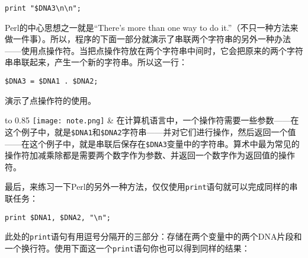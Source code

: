 \begin{lstlisting}
print "$DNA3\n\n";
\end{lstlisting}

Perl的中心思想之一就是“There's more than one way to do it.”（不只一种方法来做一件事）。所以，程序的下面一部分就演示了串联两个字符串的另外一种办法——使用点操作符。当把点操作符放在两个字符串中间时，它会把原来的两个字符串串联起来，产生一个新的字符串。所以这一行：

\begin{lstlisting}
$DNA3 = $DNA1 . $DNA2;
\end{lstlisting}
演示了点操作符的使用。


\vspace{-5pt}
\begin{table}[h]
  \begin{center}
    \begin{tabu*} to 0.85\linewidth {|X[1,r,m]X[15,l,m]|}
      \tabucline{-}
      \texttt{[image: note.png]} & 在计算机语言中，一个操作符需要一些参数——在这个例子中，就是\verb|$DNA1|和\verb|$DNA2|字符串——并对它们进行操作，然后返回一个值——在这个例子中，就是串联后保存在\verb|$DNA3|变量中的字符串。算术中最为常见的操作符加减乘除都是需要两个数字作为参数、并返回一个数字作为返回值的操作符。\\
      \tabucline{-}
    \end{tabu*}
  \end{center}
\end{table}
\vspace{-20pt}

最后，来练习一下Perl的另外一种方法，仅仅使用\verb|print|语句就可以完成同样的串联任务：

\begin{lstlisting}
print $DNA1, $DNA2, "\n";
\end{lstlisting}

此处的\verb|print|语句有用逗号分隔开的三部分：存储在两个变量中的两个DNA片段和一个换行符。使用下面这一个\verb|print|语句你也可以得到同样的结果：

